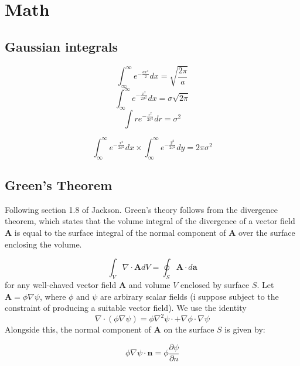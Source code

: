 \documentclass[../../main.tex]{subfiles} %
\begin{document}
\chapter{Math}
\section{Gaussian integrals}
\begin{equation}
    \int_\infty^\infty e^{-\frac{ax^2}{2}} dx = \sqrt{\frac{2\pi}{a}} 
\end{equation}
\begin{equation}
    \int_\infty^\infty e^{-\frac{x^2}{2\sigma^2}} dx = \sigma\sqrt{2\pi} 
\end{equation}
\begin{equation}
    \int r e^{-\frac{r^2}{2\sigma^2}}dr=\sigma^2
\end{equation}

\begin{equation}
    \int_\infty^\infty e^{-\frac{x^2}{2\sigma^2}} dx \times \int_\infty^\infty e^{-\frac{y^2}{2\sigma^2}} dy = 2\pi\sigma^2
\end{equation}

\section{Green's Theorem}
Following section 1.8 of Jackson. Green's theory  follows from the divergence theorem, which states that the volume integral of the divergence of a vector field $\mathbf{A}$ is equal to the surface integral of the normal component of $\mathbf{A}$ over the surface enclosing the volume.

\begin{equation}\label{eq. divergence theorem}
    \int_V \nabla\cdot\mathbf{A} dV = \oint_S \mathbf{A}\cdot d\mathbf{a}
\end{equation}
for any well-ehaved vector field $\mathbf{A}$ and volume $V$ enclosed by surface $S$. Let $\mathbf{A}=\phi\nabla\psi$, where $\phi$ and $\psi$ are arbirary scalar fields (i suppose subject to the constraint of producing a suitable vector field). We use the identity 
\begin{equation}
    \nabla\cdot(\phi\nabla\psi)=\phi\nabla^2\psi\cdot + \nabla\phi\cdot\nabla\psi
\end{equation}
Alongside this, the normal component of $\mathbf{A}$ on the surface $S$ is given by:

\begin{equation}
\phi\nabla\psi\cdot\mathbf{n} = \phi\frac{\partial\psi}{\partial n}
\end{equation}
\end{document}
